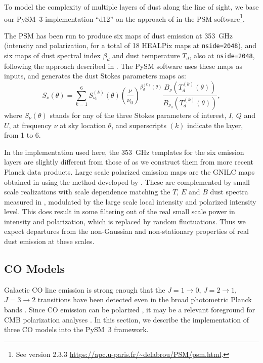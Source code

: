 \documentclass[twocolumn]{aastex631}
\begin{document}
To model the complexity of multiple layers of dust along the line of sight, we base our  PySM~3 implementation ``d12'' on the approach of \cite{Martinez-Solaeche:2018} in the PSM software\footnote{See version 2.3.3 \url{https://apc.u-paris.fr/~delabrou/PSM/psm.html}.}. 

The PSM has been run to produce six maps of dust emission at 353~GHz (intensity and polarization, for a total of 18 HEALPix maps at {\tt nside=2048}), and six maps of dust spectral index $\beta_d$ and dust temperature $T_d$, also at {\tt nside=2048}, following the approach described in \cite{Martinez-Solaeche:2018}. The PySM software uses these maps as inputs, and generates the dust Stokes parameters maps as:
\begin{equation}
    S_\nu(\theta) = \sum_{k=1}^6 S^{(k)}_{\nu_0}(\theta)
    \left( \frac{\nu}{\nu_0} \right)^{\beta^{(k)}_d(\theta)}
    \frac{B_\nu(T^{(k)}_d(\theta))}{B_{\nu_0}(T^{(k)}_d(\theta))},
\end{equation}
where $S_\nu(\theta)$ stands for any of the three Stokes parameters of interest, $I$, $Q$ and $U$, at frequency $\nu$ at sky location $\theta$, and superscripts ${(k)}$ indicate the layer, from 1 to 6.

In the implementation used here, the 353~GHz templates for the six emission layers are slightly different from those of \cite{Martinez-Solaeche:2018} as we construct them from more recent Planck data products. Large scale polarized emission maps are the GNILC maps obtained in \cite{planck2016-l04} using the method developed by \cite{Remazeilles:2011}. These are complemented by small scale realizations with scale dependence matching the $T$, $E$ and $B$ dust spectra measured in \cite{planck2016-l11A}, modulated by the large scale local intensity and polarized intensity level. This does result in some filtering out of the real small scale power in intensity and polarization, which is replaced by random fluctuations. Thus we expect departures from the non-Gaussian and non-stationary properties of real dust emission at these scales. %

\subsection{CO Models} \label{subsec:co_models}
Galactic CO line emission is strong enough that the $J = 1\rightarrow0$, $J = 2\rightarrow1$, $J = 3\rightarrow2$ transitions have been detected even in the broad photometric Planck bands \citep{planck2013-p03a, planck2014-a12}. Since CO emission can be polarized \citep{Goldreich:1981}, it may be a relevant foreground for CMB polarization analyses \citep{Puglisi:2017}. In this section, we describe the implementation of three CO models into the PySM~3 framework.
\end{document}
